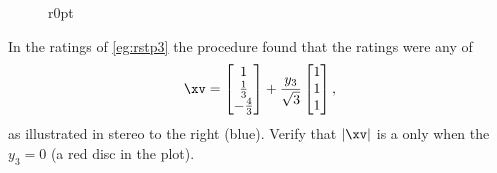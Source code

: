 \begin{figure}[7]r{0pt}
\end{figure}
\begin{example} 
In the  ratings of \cref{eg:rstp3} the procedure found that the ratings were any of
\begin{equation*}
\xv=\begin{bmatrix} 1\\\frac13\\-\frac43 \end{bmatrix}
+\frac{y_3}{\sqrt3}\begin{bmatrix} 1\\1\\1 \end{bmatrix},
\end{equation*}
as illustrated in stereo to the right (blue).
Verify that \(|\xv|\) is a  only when the  \(y_3=0\) (a red disc in the plot).


\end{example}

